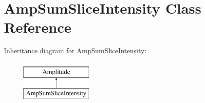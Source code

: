 \hypertarget{class_amp_sum_slice_intensity}{\section{Amp\-Sum\-Slice\-Intensity Class Reference}
\label{class_amp_sum_slice_intensity}
}
Inheritance diagram for Amp\-Sum\-Slice\-Intensity\-:\begin{figure}[H]
\begin{center}
\leavevmode
\includegraphics[height=2.000000cm]{class_amp_sum_slice_intensity}
\end{center}
\end{figure}
